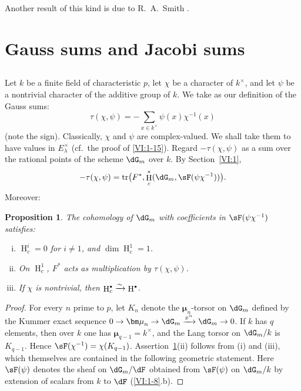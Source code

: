 \documentclass[12pt,oneside,english]{smfbook}
\DeclareMathOperator{\h}{H}
\DeclareMathOperator{\tr}{tr}
\newcommand{\dmu}{{\bm\mu}}
\newcounter{char}
\newcommand{\iso}{\xrightarrow\sim}
\newtheorem{proposition_}[subsection]{Proposition}
\let\oldbullet\bullet
\renewcommand{\bullet}{\textnormal{\tiny$\oldbullet$}}
\begin{document}
Another result of this kind is due to R.\ A.\ Smith \cite{sm70}.

\section{Gauss sums and Jacobi sums}\label{VI:4}

\subsection{}\label{VI:4-1}

Let $k$ be a finite field of characteristic $p$, let $\chi$ be a character of $k^\times$, and let $\psi$ be a nontrivial character of the additive group of $k$. We take as our definition of the Gauss sums:
\begin{equation*}\tag{4.1.1}\label{VI:eq:4-1-1}
  \tau(\chi,\psi) = -\sum_{x\in k^\times} \psi(x) \chi^{-1}(x)
\end{equation*}
(note the sign). Classically, $\chi$ and $\psi$ are complex-valued. We shall take them to have values in $E_\lambda^\times$ (cf.\ the proof of \ref{VI:1-15}). Regard $-\tau(\chi,\psi)$ as a sum over the rational points of the scheme $\dG_m$ over $k$. By Section~\ref{VI:1},
\[
  -\tau(\chi,\psi)
  =\tr\bigl(F^\ast,\h_c^\ast(\dG_m,\sF(\psi\chi^{-1}))\bigr).
\]
Moreover:

\begin{proposition_}\label{VI:4-2}
The cohomology of $\dG_m$ with coefficients in $\sF(\psi\chi^{-1})$ satisfies:
\begin{enumerate}[(i)]
  \item $\h_c^i=0$ for $i\ne 1$, and $\dim \h_c^1=1$.
  \item On $\h_c^1$, $F^\ast$ acts as multiplication by $\tau(\chi,\psi)$.
  \item If $\chi$ is nontrivial, then $\h_c^\bullet \iso \h^\bullet$.
\end{enumerate}
\end{proposition_}
\begin{proof}
For every $n$ prime to $p$, let $K_n$ denote the $\dmu_n$-torsor on $\dG_m$ defined by the Kummer exact sequence $0 \to \dmu_n \to \dG_m \xrightarrow{x^n} \dG_m \to 0$. If $k$ has $q$ elements, then over $k$ one has $\dmu_{q-1}=k^\times$, and the Lang torsor on $\dG_m/k$ is $K_{q-1}$. Hence $\sF(\chi^{-1})=\chi(K_{q-1})$. Assertion~\ref{VI:4-2}(ii) follows from (i) and (iii), which themselves are contained in the following geometric statement. Here $\sF(\psi)$ denotes the sheaf on $\dG_m/\dF$ obtained from $\sF(\psi)$ on $\dG_m/k$ by extension of scalars from $k$ to $\dF$ (\ref{VI:1-8}.b).
\end{proof}
\end{document}

